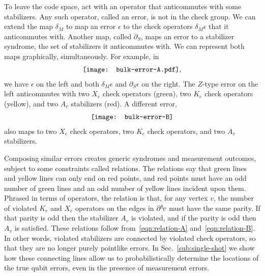 To leave the code space, act with an operator that anticommutes with some stabilizers. Any such operator, called an error, is not in the check group. We can extend the map $\delta_M$ to map an error $\epsilon$ to the check operators $\delta_M\epsilon$ that it anticommutes with. Another map, called $\partial_S$, maps an error to a stabilizer syndrome, the set of stabilizers it anticommutes with. We can represent both maps graphically, simultaneously. For example, in
\begin{align}
\vcenter{\hbox{\texttt{[image: bulk-error-A.pdf]}}},
\end{align}
we have $\epsilon$ on the left and both $\delta_M \epsilon$ and $\partial_S \epsilon$ on the right.
The $Z$-type error on the left anticommutes with two $X_e$ check operators (green), two $K_e$ check operators (yellow), and two $A_v$ stabilizers (red). 
A different error,
\begin{align}
\vcenter{\hbox{\texttt{[image: bulk-error-B]}}}
\end{align}
also maps to two $X_e$ check operators, two $K_e$ check operators, and two $A_v$ stabilizers. 

Composing similar errors creates generic syndromes and measurement outcomes, subject to some constraints called relations. The relations say that green lines and yellow lines can only end on red points, and red points must have an odd number of green lines and an odd number of yellow lines incident upon them. Phrased in terms of operators, the relation is that, for any vertex $v$, the number of violated $K_e$ and $X_e$ operators on the edges in $\partial^\dagger\! v$ must have the same parity. If that parity is odd then the stabilizer $A_v$ is violated, and if the parity is odd then $A_v$ is satisfied. These relations follow from~\eqref{eqn:relation-A} and~\eqref{eqn:relation-B}. In other words, violated stabilizers are connected by violated check operators, so that they are no longer purely pointlike errors. In Sec.~\ref{sub:single-shot} we show how these connecting lines allow us to probabilistically determine the locations of the true qubit errors, even in the presence of measurement errors. 

